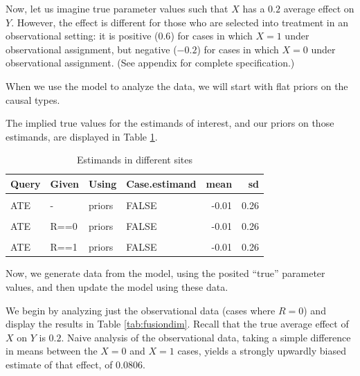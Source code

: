 \documentclass[
  12pt,
]{book}
\begin{document}
Now, let us imagine true parameter values such that \(X\) has a \(0.2\) average effect on \(Y\). However, the effect is different for those who are selected into treatment in an observational setting: it is positive (\(0.6\)) for cases in which \(X=1\) under observational assignment, but negative (\(-0.2\)) for cases in which \(X=0\) under observational assignment. (See appendix for complete specification.)

When we use the model to analyze the data, we will start with flat priors on the causal types.

The implied true values for the estimands of interest, and our priors on those estimands, are displayed in Table \ref{tab:fusionestimands}.

\begin{table}

\caption{\label{tab:fusionestimands}Estimands in different sites}
\centering
\begin{tabular}[t]{llllrr}
\toprule
Query & Given & Using & Case.estimand & mean & sd\\
\midrule
\cellcolor{gray!6}{ATE} & \cellcolor{gray!6}{-} & \cellcolor{gray!6}{parameters} & \cellcolor{gray!6}{FALSE} & \cellcolor{gray!6}{0.20} & \cellcolor{gray!6}{}\\
ATE & - & priors & FALSE & -0.01 & 0.26\\
\cellcolor{gray!6}{ATE} & \cellcolor{gray!6}{R==0} & \cellcolor{gray!6}{parameters} & \cellcolor{gray!6}{FALSE} & \cellcolor{gray!6}{0.20} & \cellcolor{gray!6}{}\\
ATE & R==0 & priors & FALSE & -0.01 & 0.26\\
\cellcolor{gray!6}{ATE} & \cellcolor{gray!6}{R==1} & \cellcolor{gray!6}{parameters} & \cellcolor{gray!6}{FALSE} & \cellcolor{gray!6}{0.20} & \cellcolor{gray!6}{}\\
\addlinespace
ATE & R==1 & priors & FALSE & -0.01 & 0.26\\
\bottomrule
\end{tabular}
\end{table}

Now, we generate data from the model, using the posited ``true'' parameter values, and then update the model using these data.

We begin by analyzing just the observational data (cases where \(R=0\)) and display the results in Table \ref{tab:fusiondim}. Recall that the true average effect of \(X\) on \(Y\) is \(0.2\). Naive analysis of the observational data, taking a simple difference in means between the \(X=0\) and \(X=1\) cases, yields a strongly upwardly biased estimate of that effect, of 0.0806.
\end{document}
